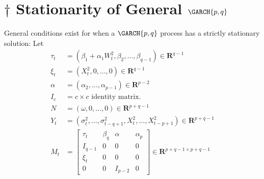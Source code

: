 \section{\texorpdfstring{$ \dagger $}{†} Stationarity of General \texorpdfstring{$ \GARCH{p,q} $}{GARCH(𝑝, 𝑞)}}
General conditions exist for when a $ \GARCH{p,q} $ process has a strictly stationary solution: Let
\begin{align*}
    \tau_{t} & =(\beta_{1}+\alpha_{1} W_{t}^{2}, \beta_{2}, \ldots, \beta_{q-1})\in \mathbf{R}^{q-1}                  \\
    \xi_{t}  & =(X_{t}^{2}, 0, \ldots, 0) \in \mathbf{R}^{q-1}                                                        \\
    \alpha   & =(\alpha_{2}, \ldots, \alpha_{p-1}) \in \mathbf{R}^{p-2}                                               \\
    I_{c}    & =c\times c \text{ identity matrix.}                                                                    \\
    N        & =(\omega, 0, \ldots, 0) \in \mathbf{R}^{p+q-1}                                                         \\
    Y_{t}    & =(\sigma_{t}^{2}, \ldots, \sigma_{t-q+1}^{2}, X_{t}^{2}, \ldots, X_{t-p+1}^{2}) \in \mathbf{R}^{p+q-1} \\
    M_{t}    & =\begin{bmatrix}
        \tau_{t} & \beta_{q} & \alpha  & \alpha_{p} \\
        I_{q-1}  & 0         & 0       & 0          \\
        \xi_{t}  & 0         & 0       & 0          \\
        0        & 0         & I_{p-2} & 0
    \end{bmatrix}\in \mathbf{R}^{p+q-1 \times p+q-1}
\end{align*}

